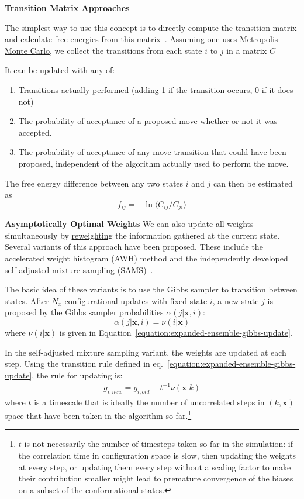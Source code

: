 \documentclass[9pt,review]{livecoms}
\newcommand{\vx}{\mathbf{x}}
\begin{document}
\textbf{Transition Matrix Approaches}

The simplest way to use this concept is to directly compute the transition matrix and calculate free energies from this matrix~\cite{siderius_2013}. Assuming one uses \hyperlink{ref:MetropolisMonteCarlo} {Metropolis Monte Carlo}, we collect the transitions from each state $i$ to $j$ in a matrix $C$ 

It can be updated with any of:
\begin{enumerate}
\item Transitions actually performed (adding 1 if the transition occurs, 0 if it does not)\label{item:actual}
\item The probability of acceptance of a proposed move whether or not it was accepted.\label{item:proposal}
\item The probability of acceptance of any move transition that could have been proposed, independent of the algorithm actually used to perform the move. \label{item:transition}
\end{enumerate}

The free energy difference between any two states $i$ and $j$ can then be estimated as
\begin{equation}
f_{ij} = - \ln \langle C_{ij}/C_{ji} \rangle
\label{eq:transitionmc}
\end{equation}

\textbf{Asymptotically Optimal Weights}
We can also update all weights simultaneously by \hyperlink{ref:Reweighting} {reweighting} the
information gathered at the current state.   Several variants of this approach have been proposed. These include the accelerated weight histogram (AWH) method
\cite{Lidmar2012} and the independently developed self-adjusted mixture sampling (SAMS)~\cite{tan_optimally_2017}.

The basic idea of these variants is to use the Gibbs sampler to transition between states. After $N_x$ configurational updates with fixed state $i$, a new state $j$ is proposed by the Gibbs sampler probabilities $\alpha(j|\vx, i)$:
\begin{equation}\label{eq:gibbsproposal}
  \alpha(j|\vx, i) = \nu(i|\vx)
\end{equation}
where $\nu(i|\vx)$ is given in Equation~\ref{equation:expanded-ensemble-gibbs-update}.

In the self-adjusted mixture sampling variant, the weights are updated at each step. Using the transition rule defined in eq.~\ref{equation:expanded-ensemble-gibbs-update}, the rule for updating is:
\begin{eqnarray}
g_{i,new} = g_{i,old} - t^{-1}\nu(\vx|k)
\end{eqnarray}
where $t$ is a timescale that is ideally the number of uncorrelated steps in $(k,\vx)$ space that have been taken in the algorithm so far.\footnote{$t$ is not necessarily the number of timesteps taken so far in the simulation: if the correlation time in configuration space is slow, then updating the weights at every step, or updating them every step without a scaling factor to make their contribution smaller might lead to premature convergence of the biases on a subset of the conformational states.}
\end{document}
